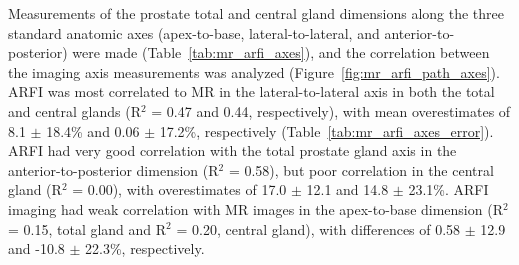 

Measurements of the prostate total and central gland dimensions along the three
standard anatomic axes (apex-to-base, lateral-to-lateral, and
anterior-to-posterior) were made (Table~\ref{tab:mr_arfi_axes}), and the
correlation between the imaging axis measurements was analyzed
(Figure~\ref{fig:mr_arfi_path_axes}).  ARFI was most correlated to MR in the
lateral-to-lateral axis in both the total and central glands (R$^2$ = 0.47 and
0.44, respectively), with mean overestimates of 8.1 $\pm$ 18.4\% and 0.06 $\pm$
17.2\%, respectively (Table~\ref{tab:mr_arfi_axes_error}).  ARFI had very good
correlation with the total prostate gland axis in the anterior-to-posterior
dimension (R$^2$ = 0.58), but poor correlation in the central gland (R$^2$ =
0.00), with overestimates of 17.0 $\pm$ 12.1 and 14.8 $\pm$ 23.1\%.  ARFI
imaging had weak correlation with MR images in the apex-to-base dimension
(R$^2$ = 0.15, total gland and R$^2$ = 0.20, central gland), with differences
of 0.58 $\pm$ 12.9 and -10.8 $\pm$ 22.3\%, respectively.





%

%

%
